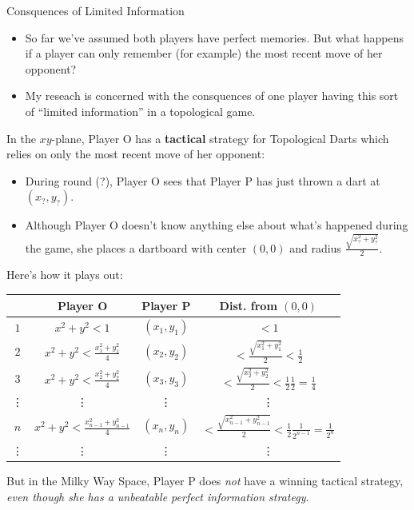 \documentclass{beamer}
\begin{document}
\begin{frame}{Consquences of Limited Information}
  \begin{itemize}
    \item
      So far we've assumed both players have perfect memories. But what happens if a player can only remember (for example) the most recent move of her opponent?
    \pause
    \item
      My reseach is concerned with the consquences of one player having this sort of ``limited information'' in a topological game.
  \end{itemize}
\end{frame}
\begin{frame}
  In the $xy$-plane, Player O has a \textbf{tactical} strategy for Topological Darts which relies on only the most recent move of her opponent:
  \begin{itemize}
    \item
      During round (?), Player O sees that Player P has just thrown a dart at $(x_?,y_?)$.
    \item
      Although Player O doesn't know anything else about what's happened during the game, she places a dartboard with center $(0,0)$ and radius $\frac{\sqrt{x_?^2+y_?^2}}{2}$.
  \end{itemize}
\end{frame}
\begin{frame}
Here's how it plays out:
\begin{center}
\begin{tabular}{c|c|c|c}
 & Player O & Player P & Dist. from $(0,0)$ \\\hline
$1$ & $x^2+y^2 < 1$ & $(x_1,y_1)$ & $< 1$ \\
$2$ & $x^2+y^2 < \frac{x_1^2+y_1^2}{4}$ & $(x_2,y_2)$ & $< \frac{\sqrt{x_1^2+y_1^2}}{2} < \frac{1}{2}$ \\
$3$ & $x^2+y^2 < \frac{x_2^2+y_2^2}{4}$ & $(x_3,y_3)$ & $< \frac{\sqrt{x_2^2+y_2^2}}{2} < \frac{1}{2}\frac{1}{2}=\frac{1}{4}$ \\
\vdots & \vdots & \vdots & \vdots \\
$n$ & $x^2+y^2 < \frac{x_{n-1}^2+y_{n-1}^2}{4}$ & $(x_n,y_n)$ & $< \frac{\sqrt{x_{n-1}^2+y_{n-1}^2}}{2} < \frac{1}{2}\frac{1}{2^{n-1}} = \frac{1}{2^n}$ \\
\vdots & \vdots & \vdots & \vdots \\
\end{tabular}
\end{center}
\end{frame}
\begin{frame}
  But in the Milky Way Space, Player P does \textit{not} have a winning tactical strategy, \pause\textit{even though she has a unbeatable perfect information strategy}.
\end{frame}
\end{document}
